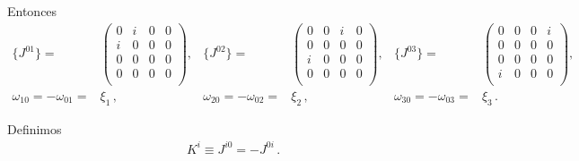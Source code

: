 \begin{frame}
Entonces
\begin{align}
  \label{eq:xii}
 \{ J^{01}\}=& \begin{pmatrix}
     0 & i & 0 & 0\\
     i & 0 & 0 & 0\\
     0 & 0 & 0 & 0\\      
     0 & 0 & 0 & 0\\      
   \end{pmatrix},&
 \{ J^{02}\}=& \begin{pmatrix}
     0 & 0 & i & 0\\
     0 & 0 & 0 & 0\\
     i & 0 & 0 & 0\\      
     0 & 0 & 0 & 0\\      
   \end{pmatrix},&
 \{ J^{03}\}=& \begin{pmatrix}
     0 & 0 & 0 & i\\
     0 & 0 & 0 & 0\\
     0 & 0 & 0 & 0\\      
     i & 0 & 0 & 0\\      
   \end{pmatrix},  \nonumber\\
\omega_{10}=-\omega_{01}=&\xi_1\,,&\omega_{20}=-\omega_{02}=&\xi_2\,,&\omega_{30}=-\omega_{03}=&\xi_3\,.
\end{align}

Definimos
\begin{align}
  K^{i}\equiv J^{i0}=-J^{0i}\,.
\end{align}


\end{frame}

